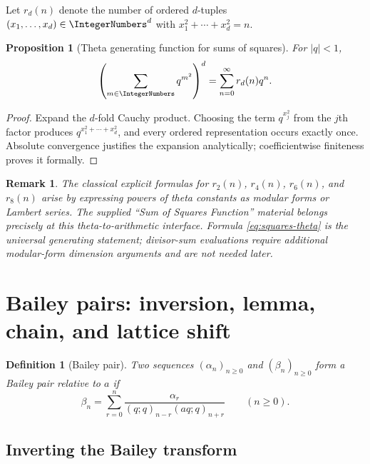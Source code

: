 \documentclass[11pt]{article}
\theoremstyle{blueplain}
\newtheorem{proposition}[theorem]{Proposition}
\theoremstyle{bluedef}
\newtheorem{definition}[theorem]{Definition}
\newtheorem{remark}[theorem]{Remark}
\begin{document}
Let $r_d(n)$ denote the number of ordered $d$-tuples $(x_1,\ldots,x_d)\in\IntegerNumbers^d$ with $x_1^2+\cdots+x_d^2=n$.

\begin{proposition}[Theta generating function for sums of squares]\label{prop:squares-theta}
For $|q|<1$,
\begin{equation}\label{eq:squares-theta}
\left(\sum_{m\in\IntegerNumbers}q^{m^2}\right)^d
=\sum_{n=0}^{\infty}r_d(n)q^n.
\end{equation}
\end{proposition}

\begin{proof}
Expand the $d$-fold Cauchy product.  Choosing the term $q^{x_j^2}$ from the $j$th factor produces $q^{x_1^2+\cdots+x_d^2}$, and every ordered representation occurs exactly once.  Absolute convergence justifies the expansion analytically; coefficientwise finiteness proves it formally.
\end{proof}

\begin{remark}
The classical explicit formulas for $r_2(n)$, $r_4(n)$, $r_6(n)$, and $r_8(n)$ arise by expressing powers of theta constants as modular forms or Lambert series.  The supplied ``Sum of Squares Function'' material belongs precisely at this theta-to-arithmetic interface.  Formula \eqref{eq:squares-theta} is the universal generating statement; divisor-sum evaluations require additional modular-form dimension arguments and are not needed later.
\end{remark}

\section{Bailey pairs: inversion, lemma, chain, and lattice shift}

\begin{definition}[Bailey pair]
Two sequences $(\alpha_n)_{n\ge0}$ and $(\beta_n)_{n\ge0}$ form a \emph{Bailey pair relative to $a$} if
\begin{equation}\label{eq:bailey-pair}
\beta_n=\sum_{r=0}^{n}
\frac{\alpha_r}{(q;q)_{n-r}(aq;q)_{n+r}}
\qquad(n\ge0).
\end{equation}
\end{definition}

\subsection{Inverting the Bailey transform}
\end{document}
